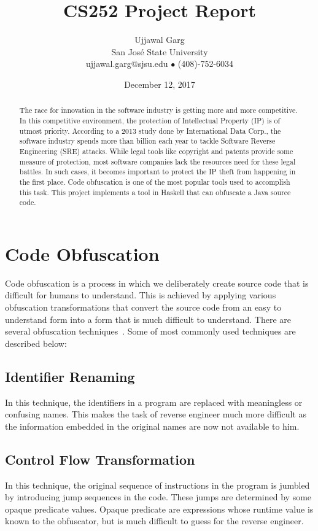 \documentclass{article}
\title{CS252 Project Report}
\author{
	Ujjawal Garg \\
	San Jos\'{e} State University \\
	ujjawal.garg@sjsu.edu $\bullet$ (408)-752-6034
	}
\date{December 12, 2017}
\begin{document}
\maketitle

\begin{abstract}
\noindent
The race for innovation in the software industry is getting more and more competitive. In
this competitive environment, the protection of Intellectual Property (IP) is of utmost
priority. According to a 2013 study done by International Data Corp., the software
industry spends more than  billion each year to tackle Software Reverse
Engineering (SRE) attacks. While legal tools like copyright and patents provide some
measure of protection, most software companies lack the resources need for these
legal battles. In such cases, it becomes important to protect the IP theft from happening
in the first place. Code obfuscation is one of the most popular tools used to accomplish
this task. This project implements a tool in Haskell that can obfuscate a Java
source code.
\end{abstract}

\section{Code Obfuscation}
Code obfuscation is a process in which we deliberately create source code that is
difficult for humans to understand. This is achieved by applying various obfuscation
transformations that convert the source code from an easy to understand form into a
form that is much difficult to understand. There are several obfuscation techniques~\cite{collberg}. 
Some of most commonly used techniques are described below:

\subsection{Identifier Renaming} \label{sec:id_renaming}
In this technique, the identifiers in a program are replaced with meaningless or confusing names. This makes the task
of reverse engineer much more difficult as the information embedded in the original names are now not available to him. 


\subsection{Control Flow Transformation}
In this technique, the original sequence of instructions in the program is jumbled by introducing jump sequences in the code. These
jumps are determined by some opaque predicate values. Opaque predicate are expressions whose runtime value is known to the obfuscator, but is 
much difficult to guess for the reverse engineer.
\end{document}
